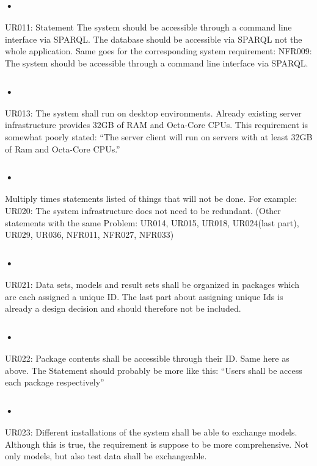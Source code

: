 \documentclass{article}
\begin{document}
\subsubsection{•}
UR011: Statement The system should be accessible through a command line interface via SPARQL.
The database should be accessible via SPARQL not the whole application. Same goes for the corresponding system requirement: 
NFR009: The system should be accessible through a command line interface via SPARQL.
 
\subsubsection{•}
UR013: The system shall run on desktop environments. Already existing server infrastructure provides 32GB of RAM and Octa-Core CPUs.
This requirement is somewhat poorly stated: “The server client will run on servers with at least 32GB of Ram and Octa-Core CPUs.”

\subsubsection{•}
Multiply times statements listed of things that will not be done. For example:
UR020: The system infrastructure does not need to be redundant. (Other statements with the same Problem: UR014, UR015, UR018, UR024(last part), UR029, UR036, NFR011, NFR027, NFR033)

\subsubsection{•}
UR021: Data sets, models and result sets shall be organized in packages which are each assigned a unique ID.
The last part about assigning unique Ids is already a design decision and should therefore not be included.

\subsubsection{•}
UR022: Package contents shall be accessible through their ID.
Same here as above. The Statement should probably be more like this:
“Users shall be access each package respectively”

\subsubsection{•}
UR023: Different installations of the system shall be able to exchange models.
Although this is true, the requirement is suppose to be more comprehensive. Not only models, but also test data shall be exchangeable.
\end{document}
